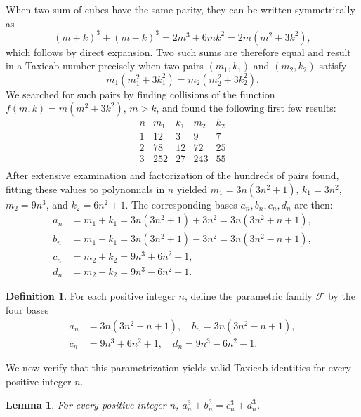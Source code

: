 \documentclass[12pt]{amsart}
\newtheorem{lemma}{Lemma}
\theoremstyle{definition}
\newtheorem{definition}{Definition}
\theoremstyle{remark}
\begin{document}
When two sum of cubes have the same parity, they can be written 
symmetrically as
\[
  (m+k)^3 + (m-k)^3 = 2m^3 + 6mk^2 = 2m(m^2 + 3k^2),
\]
which follows by direct expansion. Two such sums are therefore equal and result in a Taxicab number
precisely when two pairs $(m_1, k_1)$ and $(m_2, k_2)$ satisfy
\[
  m_1(m_1^2 + 3k_1^2) = m_2(m_2^2 + 3k_2^2).
\]
We searched for such pairs by finding collisions of the function 
$f(m,k) = m(m^2 + 3k^2)$, $m > k$, and found the following first few  results:
\[
\begin{array}{c|cccc}
n & m_1 & k_1 & m_2 & k_2  \\
\hline
1 & 12 & 3 & 9  & 7    \\
2 & 78 & 12 & 72 & 25  \\
3 & 252 & 27 & 243 & 55  \\
\end{array}
\]
After extensive examination and factorization of the hundreds of pairs found, fitting these values to polynomials in $n$ yielded $m_1 = 3n(3n^2 + 1)$, 
$k_1 = 3n^2$, $m_2 = 9n^3$, and $k_2 = 6n^2 + 1$. The corresponding 
bases $a_n, b_n, c_n, d_n$ are then:
\begin{align*}
  a_n &= m_1 + k_1 = 3n(3n^2+1) + 3n^2 = 3n(3n^2 + n + 1), \\
  b_n &= m_1 - k_1 = 3n(3n^2+1) - 3n^2 = 3n(3n^2 - n + 1), \\
  c_n &= m_2 + k_2 = 9n^3 + 6n^2 + 1, \\
  d_n &= m_2 - k_2 = 9n^3 - 6n^2 - 1.
\end{align*}

\begin{definition}\label{def:family}
  For each positive integer $n$, define the parametric family $\mathcal{F}$ 
  by the four bases
  \begin{align*}
    a_n &= 3n(3n^2 + n + 1), \quad b_n = 3n(3n^2 - n + 1), \\
    c_n &= 9n^3 + 6n^2 + 1,  \quad d_n = 9n^3 - 6n^2 - 1.
  \end{align*}
\end{definition}

We now verify that this parametrization yields valid Taxicab identities for 
every positive integer $n$.

\begin{lemma}\label{lem:identity}
  For every positive integer $n$, $a_n^3 + b_n^3 = c_n^3 + d_n^3$.
\end{lemma}
\end{document}
